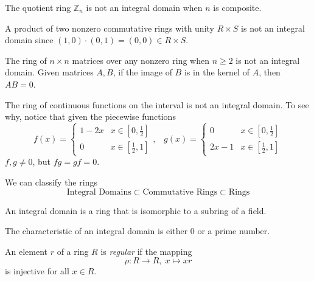 \documentclass{article}
\begin{document}
      \begin{example}
        The quotient ring $\mathbb{Z}_n$ is not an integral domain when $n$ is composite. 
      \end{example}

      \begin{example}
        A product of two nonzero commutative rings with unity $R \times S$ is not an integral domain since $(1,0) \cdot (0, 1) = (0, 0) \in R \times S$. 
      \end{example}

      \begin{example}
        The ring of $n \times n$ matrices over any nonzero ring when $ n \geq 2$ is not an integral domain. Given matrices $A, B$, if the image of $B$ is in the kernel of $A$, then $A B = 0$.
      \end{example}

      \begin{example}
        The ring of continuous functions on the interval is not an integral domain. To see why, notice that given the piecewise functions 
        \[ f (x) = \begin{cases}
        1 - 2x & x \in [0, \frac{1}{2}] \\
        0 & x \in [\frac{1}{2}, 1] 
        \end{cases}, \; \;\;g (x) = \begin{cases}
        0 & x \in [0, \frac{1}{2}] \\
        2x - 1 & x \in [\frac{1}{2}, 1] 
        \end{cases}\]
        $f, g \neq 0$, but $f g = g f = 0$. 
      \end{example}

      We can classify the rings
      \[\text{Integral Domains} \subset \text{Commutative Rings} \subset \text{Rings}\]

      \begin{proposition}
        An integral domain is a ring that is isomorphic to a subring of a field. 
      \end{proposition}

      \begin{proposition}
        The characteristic of an integral domain is either $0$ or a prime number. 
      \end{proposition}

      \begin{definition}
         An element $r$ of a ring $R$ is \textit{regular} if the mapping 
        \[ \rho: R \longrightarrow R, \; x \mapsto x r \]
        is injective for all $x \in R$. 
      \end{definition}
\end{document}
